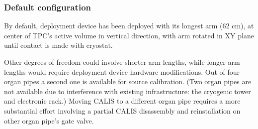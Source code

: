 \subsubsection{Default configuration}
By default, deployment device has been deployed with its longest arm (62 cm), at center of TPC's active volume in vertical direction, with arm rotated in XY plane until contact is made with cryostat. 

Other degrees of freedom could involve shorter arm lengths, while longer arm lengths would require deployment device hardware modifications. Out of four organ pipes a second one is available for source calibration. (Two organ pipes are not available due to interference with existing infrastructure: the cryogenic tower and electronic rack.) Moving CALIS to a different organ pipe requires a more substantial effort involving a partial CALIS disassembly and reinstallation on other organ pipe's gate valve.

